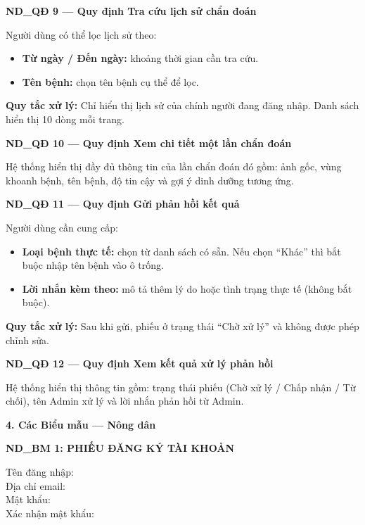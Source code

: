 \documentclass[12pt,a4paper]{article}
\begin{document}
\vspace{0.3cm}
\noindent\textbf{ND\_QĐ 9 --- Quy định Tra cứu lịch sử chẩn đoán}

Người dùng có thể lọc lịch sử theo:
\begin{itemize}
    \item \textbf{Từ ngày / Đến ngày:} khoảng thời gian cần tra cứu.
    \item \textbf{Tên bệnh:} chọn tên bệnh cụ thể để lọc.
\end{itemize}
\textbf{Quy tắc xử lý:} Chỉ hiển thị lịch sử của chính người đang đăng nhập. Danh sách hiển thị 10 dòng mỗi trang.

\vspace{0.3cm}
\noindent\textbf{ND\_QĐ 10 --- Quy định Xem chi tiết một lần chẩn đoán}

Hệ thống hiển thị đầy đủ thông tin của lần chẩn đoán đó gồm: ảnh gốc, vùng khoanh bệnh, tên bệnh, độ tin cậy và gợi ý dinh dưỡng tương ứng.

\vspace{0.3cm}
\noindent\textbf{ND\_QĐ 11 --- Quy định Gửi phản hồi kết quả}

Người dùng cần cung cấp:
\begin{itemize}
    \item \textbf{Loại bệnh thực tế:} chọn từ danh sách có sẵn. Nếu chọn ``Khác'' thì bắt buộc nhập tên bệnh vào ô trống.
    \item \textbf{Lời nhắn kèm theo:} mô tả thêm lý do hoặc tình trạng thực tế (không bắt buộc).
\end{itemize}
\textbf{Quy tắc xử lý:} Sau khi gửi, phiếu ở trạng thái ``Chờ xử lý'' và không được phép chỉnh sửa.

\vspace{0.3cm}
\noindent\textbf{ND\_QĐ 12 --- Quy định Xem kết quả xử lý phản hồi}

Hệ thống hiển thị thông tin gồm: trạng thái phiếu (Chờ xử lý / Chấp nhận / Từ chối), tên Admin xử lý và lời nhắn phản hồi từ Admin.

\vspace{0.3cm}
\textbf{4. Các Biểu mẫu --- Nông dân}

\vspace{0.3cm}
\noindent\textbf{ND\_BM 1: PHIẾU ĐĂNG KÝ TÀI KHOẢN}

\noindent Tên đăng nhập: \dotfill \\
Địa chỉ email: \dotfill \\
Mật khẩu: \dotfill \\
Xác nhận mật khẩu: \dotfill
\end{document}
